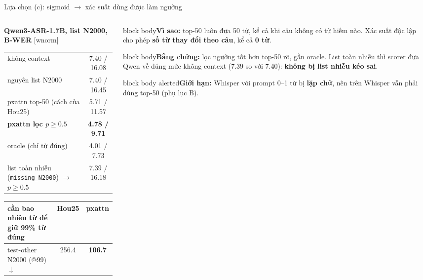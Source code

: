 \documentclass[aspectratio=169,xcolor=table]{beamer}
\newcommand{\bad}[1]{\textcolor{RiskRed}{\textbf{#1}}}
\newcommand{\good}[1]{\textcolor{GoodGreen}{\textbf{#1}}}
\newcommand{\src}[1]{{\tiny\color{TextGray}[#1]}}
\newcommand{\ra}{$\rightarrow$}
\newcommand{\nbox}[2][block body]{\begin{beamercolorbox}[sep=0.45em,rounded=true]{#1}\footnotesize #2\end{beamercolorbox}}
\begin{document}
\begin{frame}{Lựa chọn (c): sigmoid \ra{} xác suất dùng được làm ngưỡng}
\begin{columns}[T]
\begin{column}{0.54\textwidth}
\centering\scriptsize\setlength{\tabcolsep}{3pt}
\textbf{Qwen3-ASR-1.7B, list N2000, B-WER} \src{wnorm}\par\vspace{0.05cm}
\begin{tabular}{lc}
\toprule
không context & 7.40 / 16.08\\
nguyên list N2000 & 7.40 / 16.45\\
pxattn top-50 (cách của Hou25) & 5.71 / 11.57\\
\textbf{pxattn lọc $p\geq0.5$} & \good{4.78 / 9.71}\\
oracle (chỉ từ đúng) & 4.01 / 7.73\\
\midrule
list toàn nhiễu (\texttt{missing\_N2000}) \ra{} $p\geq0.5$ & 7.39 / 16.18\\
\bottomrule
\end{tabular}\par
\vspace{0.15cm}
\begin{tabular}{lcc}
\toprule
cần bao nhiêu từ để giữ 99\% từ đúng & Hou25 & pxattn\\
\midrule
test-other N2000 (@99) $\downarrow$ & 256.4 & \good{106.7}\\
\bottomrule
\end{tabular}
\end{column}
\begin{column}{0.43\textwidth}
\nbox{\textbf{Vì sao:} top-50 luôn đưa 50 từ, kể cả khi câu không có từ hiếm nào. Xác suất độc lập cho phép \textbf{số từ thay đổi theo câu}, kể cả \textbf{0 từ}.}
\vspace{0.1cm}
\nbox{\textbf{Bằng chứng:} lọc ngưỡng tốt hơn top-50 rõ, gần oracle. List toàn nhiễu thì scorer đưa Qwen về đúng mức không context (7.39 so với 7.40): \good{không bị list nhiễu kéo sai}.}
\vspace{0.1cm}
\nbox[block body alerted]{\textbf{Giới hạn:} Whisper với prompt 0--1 từ bị \bad{lặp chữ}, nên trên Whisper vẫn phải dùng top-50 (phụ lục B).}
\end{column}
\end{columns}
\end{frame}

\end{document}
